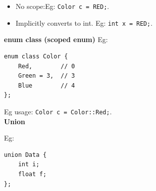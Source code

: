 \begin{itemize}
\item No scope:Eg: \texttt{Color c = RED;}.
\item Implicitly converts to int. Eg: \texttt{int x = RED;}.
\end{itemize}

\textbf{enum class (scoped enum)}
Eg:
\begin{mdframed}[nobreak=true,backgroundcolor=gray!10,linecolor=Firebrick4]
\begin{verbatim}
enum class Color {
    Red,        // 0
    Green = 3,  // 3
    Blue        // 4
};
\end{verbatim}
\end{mdframed}

Eg usage: \texttt{Color c = Color::Red;}.\\

\textbf{Union}

Eg:
\begin{mdframed}[nobreak=true,backgroundcolor=gray!10,linecolor=Firebrick4]
\begin{verbatim}
union Data {
    int i;
    float f;
};
\end{verbatim}
\end{mdframed}

